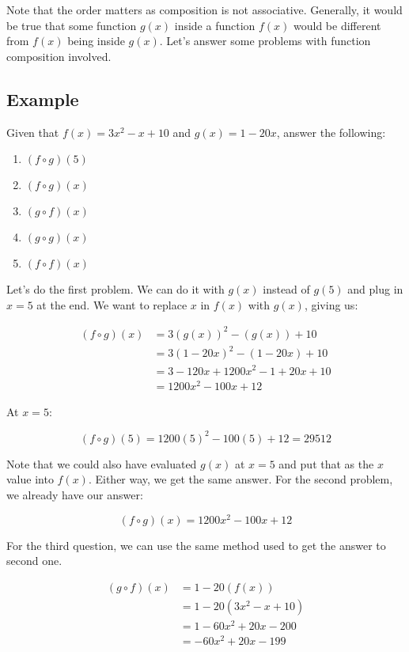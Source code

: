 \documentclass[12pt]{article}
\begin{document}
Note that the order matters as composition is not associative.
Generally, it would be true that some function $g(x)$ inside a function $f(x)$ would be different from $f(x)$ being inside $g(x)$.
Let's answer some problems with function composition involved.

\subsection{Example}
Given that $f(x) = 3x^2 - x + 10$ and $g(x) = 1 - 20x$, answer the following:

\begin{enumerate}
    \item $(f \circ g)(5)$
    \item $(f \circ g)(x)$
    \item $(g \circ f)(x)$
    \item $(g \circ g)(x)$
    \item $(f \circ f)(x)$
\end{enumerate}

Let's do the first problem. We can do it with $g(x)$ instead of $g(5)$ and plug in $x=5$ at the end.
We want to replace $x$ in $f(x)$ with $g(x)$, giving us:

\begin{align}
    (f \circ g)(x) & = 3(g(x))^2 - (g(x)) + 10           \\
                   & = 3(1 - 20x)^2 - (1 - 20x) + 10     \\
                   & = 3 - 120x + 1200x^2 - 1 + 20x + 10 \\
                   & = 1200x^2 - 100x + 12
\end{align}

At $x=5$:

\begin{equation}
    (f \circ g)(5) = 1200(5)^2 - 100(5) + 12 = 29512
\end{equation}

Note that we could also have evaluated $g(x)$ at $x=5$ and put that as the $x$ value into $f(x)$.
Either way, we get the same answer.
For the second problem, we already have our answer:

\begin{equation}
    (f \circ g)(x) = 1200x^2 - 100x + 12
\end{equation}

For the third question, we can use the same method used to get the answer to second one.

\begin{align}
    (g \circ f)(x) & = 1 - 20(f(x))          \\
                   & = 1 - 20(3x^2 - x + 10) \\
                   & = 1 - 60x^2 + 20x - 200 \\
                   & = -60x^2 + 20x - 199
\end{align}
\end{document}
